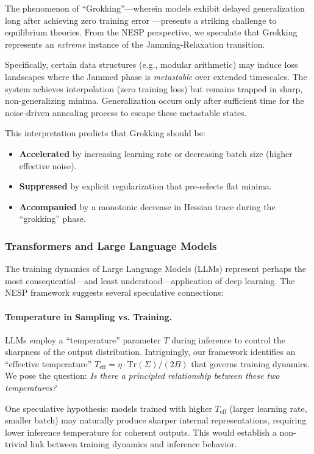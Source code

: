 \documentclass[
  journal=largetwo,
  year=2025,
  volume=37,
]{cup-journal}
\begin{document}
The phenomenon of ``Grokking''---wherein models exhibit delayed generalization long after achieving zero training error \cite{power2022grokking}---presents a striking challenge to equilibrium theories. From the NESP perspective, we speculate that Grokking represents an \textit{extreme} instance of the Jamming-Relaxation transition.

Specifically, certain data structures (e.g., modular arithmetic) may induce loss landscapes where the Jammed phase is \textit{metastable} over extended timescales. The system achieves interpolation (zero training loss) but remains trapped in sharp, non-generalizing minima. Generalization occurs only after sufficient time for the noise-driven annealing process to escape these metastable states.

This interpretation predicts that Grokking should be:
\begin{itemize}
    \item \textbf{Accelerated} by increasing learning rate or decreasing batch size (higher effective noise).
    \item \textbf{Suppressed} by explicit regularization that pre-selects flat minima.
    \item \textbf{Accompanied} by a monotonic decrease in Hessian trace during the ``grokking'' phase.
\end{itemize}

\subsubsection{Transformers and Large Language Models}

The training dynamics of Large Language Models (LLMs) represent perhaps the most consequential---and least understood---application of deep learning. The NESP framework suggests several speculative connections:

\paragraph{Temperature in Sampling vs. Training.} LLMs employ a ``temperature'' parameter $T$ during inference to control the sharpness of the output distribution. Intriguingly, our framework identifies an ``effective temperature'' $T_{\text{eff}} = \eta \cdot \mathrm{Tr}(\Sigma)/(2B)$ that governs training dynamics. We pose the question: \textit{Is there a principled relationship between these two temperatures?}

One speculative hypothesis: models trained with higher $T_{\text{eff}}$ (larger learning rate, smaller batch) may naturally produce sharper internal representations, requiring lower inference temperature for coherent outputs. This would establish a non-trivial link between training dynamics and inference behavior.
\end{document}
